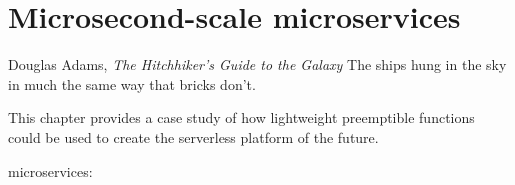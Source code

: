 \chapter{Microsecond-scale microservices}
\label{chap:microservices}

\ifdefined\chapquotes
\begin{chapquote}{Douglas Adams, \textit{The Hitchhiker's Guide to the Galaxy}}
The ships hung in the sky in much the same way that bricks don't.
\end{chapquote}
\fi



This chapter provides a case study of how lightweight preemptible functions could be
used to create the serverless platform of the future.

\begin{namespacereferences}{microservices:}










\end{namespacereferences}
